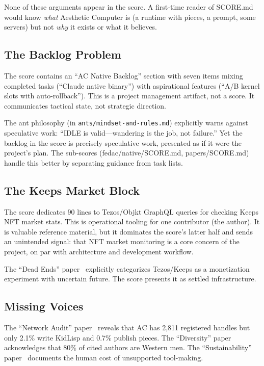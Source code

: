 \documentclass[10pt,letterpaper,twocolumn]{article}
\begin{document}
None of these arguments appear in the score. A first-time reader of SCORE.md would know \emph{what} Aesthetic Computer is (a runtime with pieces, a prompt, some servers) but not \emph{why} it exists or what it believes.

\subsection{The Backlog Problem}

The score contains an ``AC Native Backlog'' section with seven items mixing completed tasks (``Claude native binary'') with aspirational features (``A/B kernel slots with auto-rollback''). This is a project management artifact, not a score. It communicates tactical state, not strategic direction.

The ant philosophy (in \texttt{ants/mindset-and-rules.md}) explicitly warns against speculative work: ``IDLE is valid---wandering is the job, not failure.'' Yet the backlog in the score is precisely speculative work, presented as if it were the project's plan. The sub-scores (fedac/native/SCORE.md, papers/SCORE.md) handle this better by separating guidance from task lists.

\subsection{The Keeps Market Block}

The score dedicates 90 lines to Tezos/Objkt GraphQL queries for checking Keeps NFT market stats. This is operational tooling for one contributor (the author). It is valuable reference material, but it dominates the score's latter half and sends an unintended signal: that NFT market monitoring is a core concern of the project, on par with architecture and development workflow.

The ``Dead Ends'' paper~\citep{scudder2026deadends} explicitly categorizes Tezos/Keeps as a monetization experiment with uncertain future. The score presents it as settled infrastructure.

\subsection{Missing Voices}

The ``Network Audit'' paper~\citep{scudder2026audit} reveals that AC has 2,811 registered handles but only 2.1\% write KidLisp and 0.7\% publish pieces. The ``Diversity'' paper~\citep{scudder2026diversity} acknowledges that 80\% of cited authors are Western men. The ``Sustainability'' paper~\citep{scudder2026sustainability} documents the human cost of unsupported tool-making.
\end{document}
